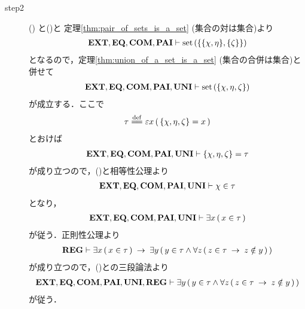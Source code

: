 \begin{sketch}
\begin{description}
			\item[step2] ()
				と()と
				定理\ref{thm:pair_of_sets_is_a_set} (集合の対は集合)より
				\begin{align}
					\mbox{{\bf EXT}},\mbox{{\bf EQ}},\mbox{\bf COM},\mbox{{\bf PAI}} \vdash 
					\operatorname*{set}\hspace{0.15em}(\{\{\chi,\eta\},\{\zeta\}\})
				\end{align}
				となるので，定理\ref{thm:union_of_a_set_is_a_set} (集合の合併は集合)と併せて
				\begin{align}
					\mbox{{\bf EXT}},\mbox{{\bf EQ}},\mbox{\bf COM},\mbox{{\bf PAI}},\mbox{{\bf UNI}} \vdash 
					\operatorname*{set}\hspace{0.15em}(\{\chi,\eta,\zeta\})
				\end{align}
				が成立する．ここで
				\begin{align}
					\tau \defeq \varepsilon x\, (\, \{\chi,\eta,\zeta\} = x\, )
					\label{fom:no_three_sets_go_round_9}
				\end{align}
				とおけば
				\begin{align}
					\mbox{{\bf EXT}},\mbox{{\bf EQ}},\mbox{\bf COM},\mbox{{\bf PAI}},\mbox{{\bf UNI}} \vdash 
					\{\chi,\eta,\zeta\} = \tau
					\label{fom:no_three_sets_go_round_10}
				\end{align}
				が成り立つので，()と相等性公理より
				\begin{align}
					\mbox{{\bf EXT}},\mbox{{\bf EQ}},\mbox{\bf COM},\mbox{{\bf PAI}},\mbox{{\bf UNI}} \vdash \chi \in \tau
					\label{fom:no_three_sets_go_round_11}
				\end{align}
				となり，
				\begin{align}
					\mbox{{\bf EXT}},\mbox{{\bf EQ}},\mbox{\bf COM},\mbox{{\bf PAI}},\mbox{{\bf UNI}} \vdash 
					\exists x\, (\, x \in \tau\, )
					\label{fom:no_three_sets_go_round_12}
				\end{align}
				が従う．正則性公理より
				\begin{align}
					\mbox{{\bf REG}} \vdash \exists x\, (\, x \in \tau\, )
					\hspace{0.25em}\rightarrow\hspace{0.25em} \exists y\, (\, y \in \tau \wedge \forall z\, (\, z \in \tau \hspace{0.25em}\rightarrow\hspace{0.25em} z \notin y\, )\, )
				\end{align}
				が成り立つので，()との三段論法より
				\begin{align}
					\mbox{{\bf EXT}},\mbox{{\bf EQ}},\mbox{\bf COM},\mbox{{\bf PAI}},\mbox{{\bf UNI}},\mbox{{\bf REG}} \vdash 
					\exists y\, (\, y \in \tau \wedge \forall z\, (\, z \in \tau \hspace{0.25em}\rightarrow\hspace{0.25em} z \notin y\, )\, )
					\label{fom:no_three_sets_go_round_22}
				\end{align}
				が従う．
				

\end{description}
\end{sketch}
